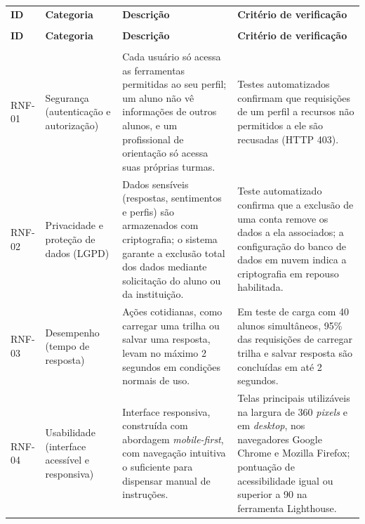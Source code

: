 {\ABNTEXfontereduzida
\renewcommand{\arraystretch}{1.25}
\begin{xltabular}{\textwidth}{|>{\centering\arraybackslash}p{1.4cm}|>{\raggedright\arraybackslash}p{2.8cm}|>{\raggedright\arraybackslash}X|>{\raggedright\arraybackslash}X|}
 \\[0.3em]
\hline
\textbf{ID} & \textbf{Categoria} & \textbf{Descrição} & \textbf{Critério de verificação} \\
\hline
\endfirsthead
{} \\
\hline
\textbf{ID} & \textbf{Categoria} & \textbf{Descrição} & \textbf{Critério de verificação} \\
\hline
\endhead
{} \\
\endfoot
\endlastfoot
RNF-01 & Segurança (autenticação e autorização) & Cada usuário só acessa as ferramentas permitidas ao seu perfil; um aluno não vê informações de outros alunos, e um profissional de orientação só acessa suas próprias turmas. & Testes automatizados confirmam que requisições de um perfil a recursos não permitidos a ele são recusadas (HTTP 403). \\
\hline
RNF-02 & Privacidade e proteção de dados (LGPD) & Dados sensíveis (respostas, sentimentos e perfis) são armazenados com criptografia; o sistema garante a exclusão total dos dados mediante solicitação do aluno ou da instituição. & Teste automatizado confirma que a exclusão de uma conta remove os dados a ela associados; a configuração do banco de dados em nuvem indica a criptografia em repouso habilitada. \\
\hline
RNF-03 & Desempenho (tempo de resposta) & Ações cotidianas, como carregar uma trilha ou salvar uma resposta, levam no máximo 2 segundos em condições normais de uso. & Em teste de carga com 40 alunos simultâneos, 95\% das requisições de carregar trilha e salvar resposta são concluídas em até 2 segundos. \\
\hline
RNF-04 & Usabilidade (interface acessível e responsiva) & Interface responsiva, construída com abordagem \textit{mobile-first}, com navegação intuitiva o suficiente para dispensar manual de instruções. & Telas principais utilizáveis na largura de 360 \textit{pixels} e em \textit{desktop}, nos navegadores Google Chrome e Mozilla Firefox; pontuação de acessibilidade igual ou superior a 90 na ferramenta Lighthouse. \\

\end{xltabular}}
